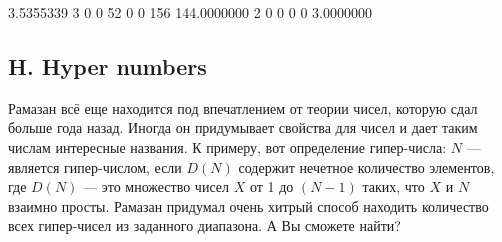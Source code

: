 
{3.5355339}
{3  0 0  52 0  0 156
}
{144.0000000}
{2  0 0  0 0
}
{3.0000000}







\subsection*{H. Hyper numbers}
 

Рамазан всё еще находится под впечатлением от теории чисел, которую сдал больше года назад. Иногда он придумывает свойства для чисел и дает таким числам интересные названия. К примеру, вот определение гипер-числа: $N$ --- является гипер-числом, если $D(N)$ содержит нечетное количество элементов, где $D(N)$ --- это множество чисел $X$ от 1 до $(N-1)$ таких, что $X$ и $N$ взаимно просты. Рамазан придумал очень хитрый способ находить количество всех гипер-чисел из заданного диапазона. А Вы сможете найти?



